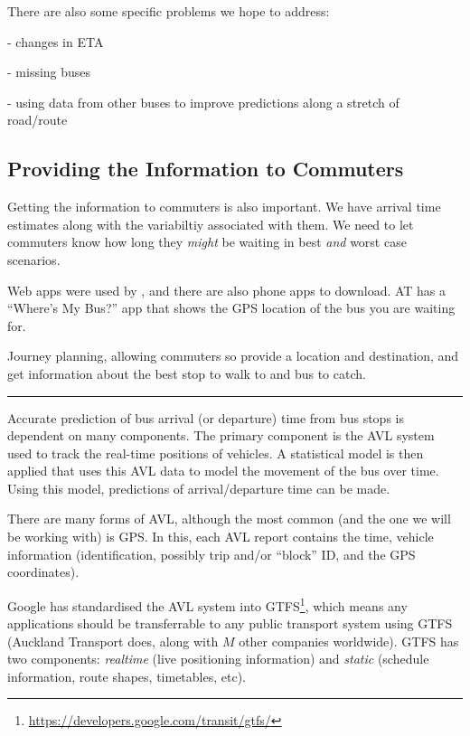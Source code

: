 \documentclass[12pt,a4paper]{article}
\begin{document}
There are also some specific problems we hope to address:

- changes in ETA

- missing buses

- using data from other buses to improve predictions along a stretch of road/route 


\subsection{Providing the Information to Commuters}
\label{sec:information_to_commuters}

Getting the information to commuters is also important.
We have arrival time estimates along with the variabiltiy associated with them.
We need to let commuters know how long they \emph{might} be waiting in best \emph{and} worst case scenarios.

Web apps were used by \cite{cathey-dailey:2003}, and there are also phone apps to download.
AT has a ``Where's My Bus?'' app that shows the GPS location of the bus you are waiting for.

Journey planning, allowing commuters so provide a location and destination, 
and get information about the best stop to walk to and bus to catch.




\vspace{1cm}
\hrule
\vspace{1cm}


Accurate prediction of bus arrival (or departure) time from bus stops is dependent on many components.
The primary component is the AVL system used to track the real-time positions of vehicles.
A statistical model is then applied that uses this AVL data to model the movement of the bus over time. 
Using this model, predictions of arrival/departure time can be made.


There are many forms of AVL, although the most common (and the one we will be working with) is GPS.
In this, each AVL report contains the time, vehicle information (identification, possibly trip and/or ``block'' ID,
and the GPS coordinates).

Google has standardised the AVL system into GTFS\footnote{\url{https://developers.google.com/transit/gtfs/}}, 
which means any applications should be transferrable to any 
public transport system using GTFS (Auckland Transport does, along with $M$ other companies worldwide).
GTFS has two components: \emph{realtime} (live positioning information) and \emph{static} (schedule information,
route shapes, timetables, etc).
\end{document}
